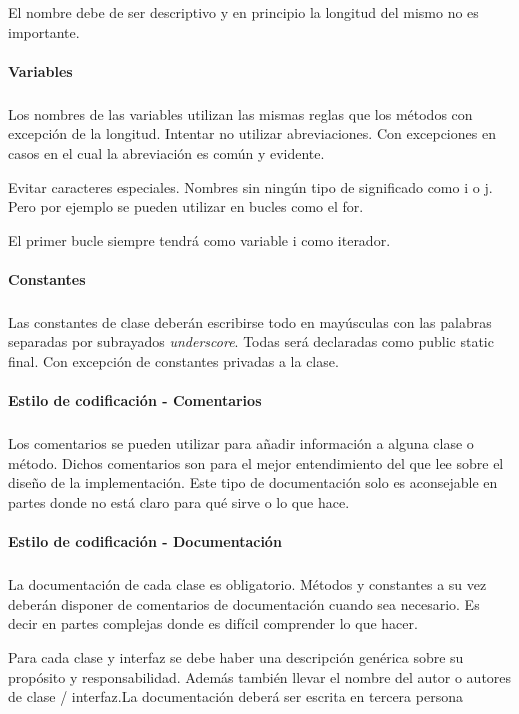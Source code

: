 El nombre debe de ser descriptivo y en principio la longitud del mismo
no es importante.

\paragraph{Variables}
\subparagraph{}
Los nombres de las variables utilizan las mismas reglas que los
métodos con excepción de la longitud. Intentar no utilizar
abreviaciones. Con excepciones en casos en el cual la abreviación es
común y evidente.

Evitar caracteres especiales. Nombres sin ningún tipo de significado
como i o j. Pero por ejemplo se pueden utilizar en bucles como el for.

El primer bucle siempre tendrá como variable i como iterador.


\paragraph{Constantes}
\subparagraph{}
Las constantes de clase deberán escribirse todo en mayúsculas con las
palabras separadas por subrayados \emph{underscore}. Todas será
declaradas como public static final. Con excepción de constantes
privadas a la clase.


\paragraph{Estilo de codificación - Comentarios}
\subparagraph{}
Los comentarios se pueden utilizar para añadir información a alguna
clase o método. Dichos comentarios son para el mejor entendimiento del
que lee sobre el diseño de la implementación. Este tipo de
documentación solo es aconsejable en partes donde no está claro para
qué sirve o lo que hace.


\paragraph{Estilo de codificación - Documentación}
\subparagraph{}
La documentación de cada clase es obligatorio. Métodos y constantes a
su vez deberán disponer de comentarios de documentación cuando sea
necesario. Es decir en partes complejas donde es difícil comprender lo
que hacer.

Para cada clase y interfaz se debe haber una descripción genérica
sobre su propósito y responsabilidad. Además también llevar el nombre
del autor o autores de clase / interfaz.La documentación deberá ser
escrita en tercera persona

